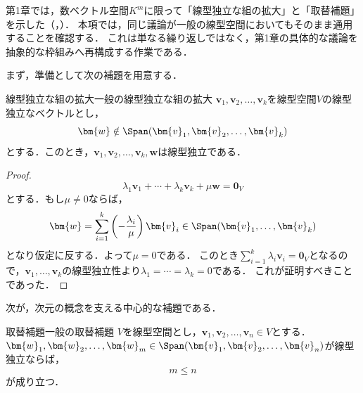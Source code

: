 第1章では，数ベクトル空間$K^m$に限って「線型独立な組の拡大」と「取替補題」を示した（，）．
本項では，同じ議論が一般の線型空間においてもそのまま通用することを確認する．
これは単なる繰り返しではなく，第1章の具体的な議論を抽象的な枠組みへ再構成する作業である．

まず，準備として次の補題を用意する．

\begin{lemma}{線型独立な組の拡大}{一般の線型独立な組の拡大}
  $\bm{v}_1, \bm{v}_2, \dots, \bm{v}_k$を線型空間$V$の線型独立なベクトルとし，
  \[
    \bm{w} \notin \Span(\bm{v}_1, \bm{v}_2, \dots, \bm{v}_k)
  \]
  とする．このとき，$\bm{v}_1, \bm{v}_2, \dots, \bm{v}_k, \bm{w}$は線型独立である．
\end{lemma}

\begin{leftbar}
\begin{proof}
  \[
    \lambda_1 \bm{v}_1 + \cdots + \lambda_k \bm{v}_k + \mu \bm{w} = \bm{0}_V
  \]
  とする．もし$\mu \ne 0$ならば，
  \[
    \bm{w} = \sum_{i=1}^{k} \left(-\frac{\lambda_i}{\mu}\right) \bm{v}_i
    \in \Span(\bm{v}_1, \dots, \bm{v}_k)
  \]
  となり仮定に反する．よって$\mu = 0$である．
  このとき$\sum_{i=1}^{k} \lambda_i \bm{v}_i = \bm{0}_V$となるので，$\bm{v}_1, \dots, \bm{v}_k$の線型独立性より$\lambda_1 = \cdots = \lambda_k = 0$である．
  これが証明すべきことであった．
\end{proof}
\end{leftbar}

次が，次元の概念を支える中心的な補題である．

\begin{lemma}{取替補題}{一般の取替補題}
  $V$を線型空間とし，$\bm{v}_1, \bm{v}_2, \dots, \bm{v}_n \in V$とする．
  $\bm{w}_1, \bm{w}_2, \dots, \bm{w}_m \in \Span(\bm{v}_1, \bm{v}_2, \dots, \bm{v}_n)$が線型独立ならば，
  \[
    m \le n
  \]
  が成り立つ．
\end{lemma}

